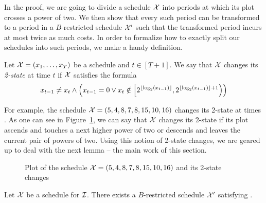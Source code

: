 In the proof, we are going to divide a schedule $\mathcal{X}$ into periods at which its plot crosses a power of two. We then show that every such period can be transformed to a period in a $B$-restricted schedule $\mathcal{X}'$ such that the transformed period incurs at most twice as much costs. In order to formalize how to exactly split our schedules into such periods, we make a handy definition.
\begin{defn}
Let $\mathcal{X}=(x_1,\dotsc,x_T)$ be a schedule and $t\in[T+1]$. We say that $\mathcal{X}$ changes its \emph{2-state} at time $t$ if $\mathcal{X}$ satisfies the formula
\begin{equation*}
	x_{t-1}\neq x_t\land \left(x_{t-1}=0 \lor x_t\notin\left[2^{\lfloor\log_2(x_{t-1})\rfloor},2^{\lfloor\log_2(x_{t-1})\rfloor+1}\right)\right)
\end{equation*}
\end{defn}
For example, the schedule $\mathcal{X}=(5,4,8,7,8,15,10,16)$ changes its 2-state at times . As one can see in Figure~\ref{fig:schedule_2_states}, we can say that $\mathcal{X}$ changes its 2-state if its plot ascends and touches a next higher power of two or descends and leaves the current pair of powers of two. Using this notion of 2-state changes, we are geared up to deal with the next lemma -- the main work of this section.
\begin{figure}[H]
\centering

\caption{Plot of the schedule $\mathcal{X}=(5,4,8,7,8,15,10,16)$ and its 2-state changes}
\label{fig:schedule_2_states}
\end{figure}
\begin{lem}\label{lem:transform_schedule_approx_2}
Let $\mathcal{X}$ be a schedule for $\mathcal{I}$. There exists a $B$-restricted schedule $\mathcal{X}'$ satisfying .
\end{lem}
